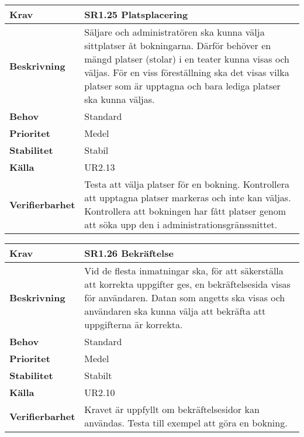 \documentclass[a4paper, twoside, 11pt, titlepage]{article}
\begin{document}
	\begin{tabular} { p{2.6cm} p{12.5cm} }
		\hline
		\sffamily\textbf{Krav} & \sffamily\textbf{SR1.25 Platsplacering } \\
		\hline
		\sffamily\textbf{Beskrivning} & Säljare och administratören ska kunna välja sittplatser åt bokningarna. Därför behöver en mängd platser (stolar) i en teater kunna visas och väljas. För en viss föreställning ska det visas vilka platser som är upptagna och bara lediga platser ska kunna väljas.  \\
		\hline
		\sffamily\textbf{Behov} & Standard  \\
		\hline
		\sffamily\textbf{Prioritet} & Medel  \\
		\hline
		\sffamily\textbf{Stabilitet} & Stabil  \\
		\hline
		\sffamily\textbf{Källa} & UR2.13  \\
		\hline
		\sffamily\textbf{Verifierbarhet} & Testa att välja platser för en bokning. Kontrollera att upptagna platser markeras och inte kan väljas. Kontrollera att bokningen har fått platser genom att söka upp den i administrationsgränssnittet.  \\
		\hline
	\end{tabular}
	\vspace{6mm}

	\begin{tabular} { p{2.6cm} p{12.5cm} }
		\hline
		\sffamily\textbf{Krav} & \sffamily\textbf{SR1.26 Bekräftelse } \\
		\hline
		\sffamily\textbf{Beskrivning} & Vid de flesta inmatningar ska, för att säkerställa att korrekta uppgifter ges, en bekräftelsesida visas för användaren. Datan som angetts ska visas och användaren ska kunna välja att bekräfta att uppgifterna är korrekta.  \\
		\hline
		\sffamily\textbf{Behov} & Standard  \\
		\hline
		\sffamily\textbf{Prioritet} & Medel  \\
		\hline
		\sffamily\textbf{Stabilitet} & Stabilt  \\
		\hline
		\sffamily\textbf{Källa} & UR2.10  \\
		\hline
		\sffamily\textbf{Verifierbarhet} & Kravet är uppfyllt om bekräftelsesidor kan användas. Testa till exempel att göra en bokning.  \\
		\hline
	\end{tabular}
	\vspace{6mm}
\end{document}
